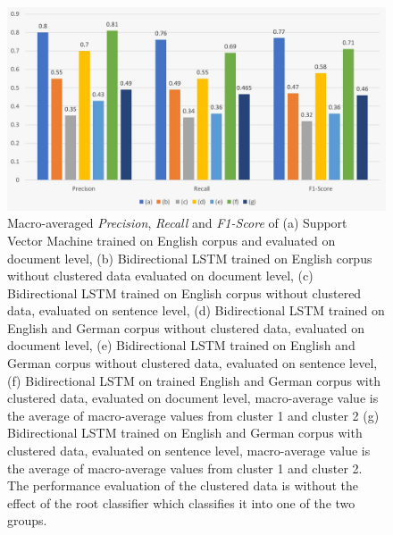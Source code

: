 \begin{figure}[!ht]
    \centering
    \includegraphics[width=15cm, keepaspectratio]{pics/Q1.jpeg}
    \caption{Macro-averaged \textit{Precision}, \textit{Recall} and \textit{F1-Score} of (a) Support Vector Machine trained on English corpus and evaluated on document level, (b) Bidirectional LSTM trained on English corpus without clustered data evaluated on document level, (c) Bidirectional LSTM trained on English corpus without clustered data, evaluated on sentence level, (d) Bidirectional LSTM trained on English and German corpus without clustered data, evaluated on document level, (e)
    Bidirectional LSTM trained on English and German corpus without clustered data, evaluated on sentence level, (f)
    Bidirectional LSTM on trained English and German corpus with clustered data, evaluated on document level, macro-average value is the average of macro-average values from cluster 1 and cluster 2  (g) Bidirectional LSTM trained on English and German corpus with clustered data, evaluated on sentence level, macro-average value is the average of macro-average values from cluster 1 and cluster 2. The performance evaluation of the clustered data is without the effect of the root classifier which classifies it into one of the two groups.}
    \label{fig:question1Eval}
\end{figure}

